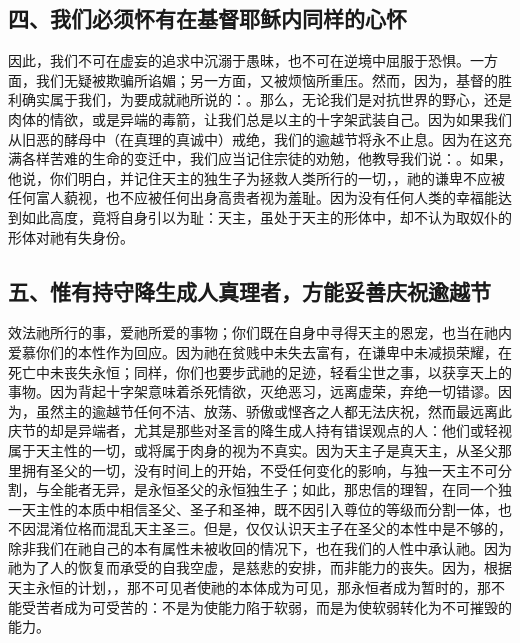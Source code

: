\subsection{四、我们必须怀有在基督耶稣内同样的心怀}

因此，我们不可在虚妄的追求中沉溺于愚昧，也不可在逆境中屈服于恐惧。一方面，我们无疑被欺骗所谄媚；另一方面，又被烦恼所重压。然而，因为，基督的胜利确实属于我们，为要成就祂所说的：。那么，无论我们是对抗世界的野心，还是肉体的情欲，或是异端的毒箭，让我们总是以主的十字架武装自己。因为如果我们从旧恶的酵母中（在真理的真诚中）戒绝，我们的逾越节将永不止息。因为在这充满各样苦难的生命的变迁中，我们应当记住宗徒的劝勉，他教导我们说：。如果，他说，你们明白，并记住天主的独生子为拯救人类所行的一切，，祂的谦卑不应被任何富人藐视，也不应被任何出身高贵者视为羞耻。因为没有任何人类的幸福能达到如此高度，竟将自身引以为耻：天主，虽处于天主的形体中，却不认为取奴仆的形体对祂有失身份。\par


\subsection{五、惟有持守降生成人真理者，方能妥善庆祝逾越节}

效法祂所行的事，爱祂所爱的事物；你们既在自身中寻得天主的恩宠，也当在祂内爱慕你们的本性作为回应。因为祂在贫贱中未失去富有，在谦卑中未减损荣耀，在死亡中未丧失永恒；同样，你们也要步武祂的足迹，轻看尘世之事，以获享天上的事物。因为背起十字架意味着杀死情欲，灭绝恶习，远离虚荣，弃绝一切错谬。因为，虽然主的逾越节任何不洁、放荡、骄傲或悭吝之人都无法庆祝，然而最远离此庆节的却是异端者，尤其是那些对圣言的降生成人持有错误观点的人：他们或轻视属于天主性的一切，或将属于肉身的视为不真实。因为天主子是真天主，从圣父那里拥有圣父的一切，没有时间上的开始，不受任何变化的影响，与独一天主不可分割，与全能者无异，是永恒圣父的永恒独生子；如此，那忠信的理智，在同一个独一天主性的本质中相信圣父、圣子和圣神，既不因引入尊位的等级而分割一体，也不因混淆位格而混乱天主圣三。但是，仅仅认识天主子在圣父的本性中是不够的，除非我们在祂自己的本有属性未被收回的情况下，也在我们的人性中承认祂。因为祂为了人的恢复而承受的自我空虚，是慈悲的安排，而非能力的丧失。因为，根据天主永恒的计划，，那不可见者使祂的本体成为可见，那永恒者成为暂时的，那不能受苦者成为可受苦的：不是为使能力陷于软弱，而是为使软弱转化为不可摧毁的能力。\par

